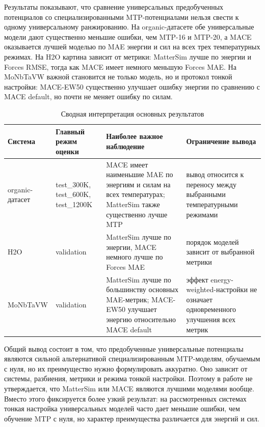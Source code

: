 Результаты показывают, что сравнение универсальных предобученных потенциалов со специализированными MTP-потенциалами нельзя свести к одному универсальному ранжированию. На organic-датасете обе универсальные модели дают существенно меньшие ошибки, чем MTP-16 и MTP-20, а MACE оказывается лучшей моделью по MAE энергии и сил на всех трех температурных режимах. На H2O картина зависит от метрики: MatterSim лучше по энергии и Forces RMSE, тогда как MACE имеет немного меньшую Forces MAE. На MoNbTaVW важной становится не только модель, но и протокол тонкой настройки: MACE-EW50 существенно улучшает ошибку энергии по сравнению с MACE default, но почти не меняет ошибку по силам.

\begin{table}[ht]
\centering
\small
\caption{Сводная интерпретация основных результатов}
\label{tab:summary_interpretation}
\begin{tabularx}{\textwidth}{@{}l>{\raggedright\arraybackslash}X>{\raggedright\arraybackslash}X>{\raggedright\arraybackslash}X@{}}
\toprule
Система & Главный режим оценки & Наиболее важное наблюдение & Ограничение вывода \\
\midrule
organic-датасет & test\_300K, test\_600K, test\_1200K & MACE имеет наименьшие MAE по энергиям и силам на всех температурах; MatterSim также существенно лучше MTP & вывод относится к переносу между выбранными температурными режимами \\
H2O & validation & MatterSim лучше по энергии, MACE немного лучше по Forces MAE & порядок моделей зависит от выбранной метрики \\
MoNbTaVW & validation & MatterSim лучше по большинству основных MAE-метрик; MACE-EW50 улучшает энергию относительно MACE default & эффект energy-weighted-настройки не означает одновременного улучшения всех метрик \\
\bottomrule
\end{tabularx}
\end{table}

Общий вывод состоит в том, что предобученные универсальные потенциалы являются сильной альтернативой специализированным MTP-моделям, обучаемым с нуля, но их преимущество нужно формулировать аккуратно. Оно зависит от системы, разбиения, метрики и режима тонкой настройки. Поэтому в работе не утверждается, что MatterSim или MACE являются лучшими моделями вообще. Вместо этого фиксируется более узкий результат: на рассмотренных системах тонкая настройка универсальных моделей часто дает меньшие ошибки, чем обучение MTP с нуля, но характер преимущества различается для энергий и сил.
